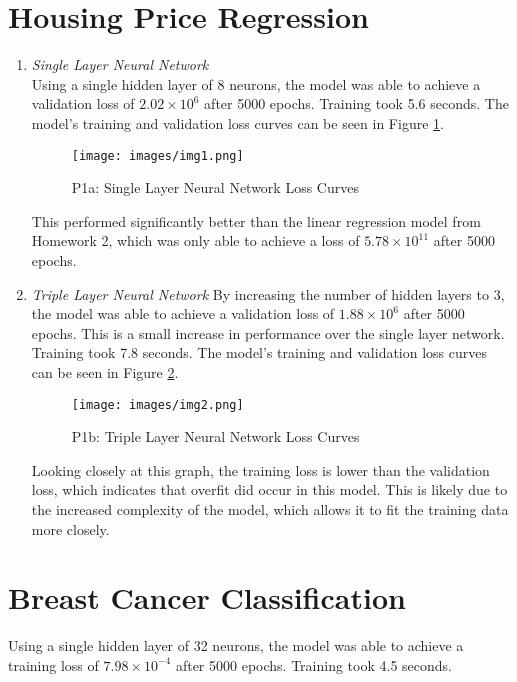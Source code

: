 \documentclass{article}
\begin{document}


\section{Housing Price Regression}
\begin{enumerate}[label=\alph*. ]
    \item \textit{Single Layer Neural Network}
        \\ Using  a single hidden layer of 8 neurons, the model was able to achieve a validation loss of $2.02 \times 10^6$ after 5000 epochs. Training took 5.6 seconds. The model's training and validation loss curves can be seen in Figure \ref{fig:P1a}.

    \begin{figure}[htbp]
        \centering
        \texttt{[image: images/img1.png]}
        \caption{P1a: Single Layer Neural Network Loss Curves}
        \label{fig:P1a}
    \end{figure}

    This performed significantly better than the linear regression model from Homework 2, which was only able to achieve a loss of $5.78 \times 10^{11}$ after 5000 epochs.

    \item \textit{Triple Layer Neural Network}
        By increasing the number of hidden layers to 3, the model was able to achieve a validation loss of $1.88 \times 10^6$ after 5000 epochs. This is a small increase in performance over the single layer network. Training took 7.8 seconds. The model's training and validation loss curves can be seen in Figure \ref{fig:P1b}.

        \begin{figure}[htbp]
            \centering
            \texttt{[image: images/img2.png]}
            \caption{P1b: Triple Layer Neural Network Loss Curves}
            \label{fig:P1b}
        \end{figure}
        Looking closely at this graph, the training loss is lower than the validation loss, which indicates that overfit did occur in this model. This is likely due to the increased complexity of the model, which allows it to fit the training data more closely. 
\end{enumerate}

\section{Breast Cancer Classification}
    Using a single hidden layer of 32 neurons, the model was able to achieve a training loss of $7.98 \times 10^{-4}$ after 5000 epochs. Training took 4.5 seconds.
\end{document}
